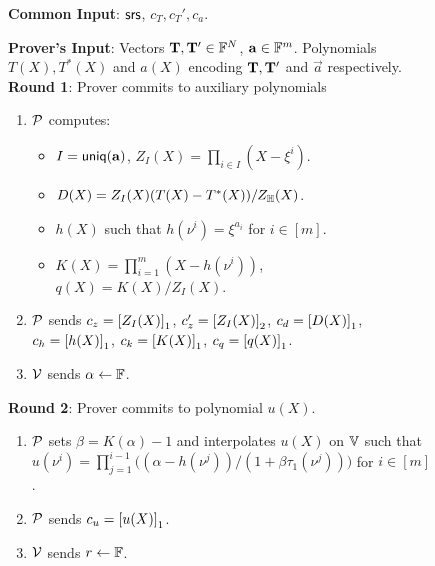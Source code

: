 \begin{figure}[htbp]
    \begin{mdframed}

        {\bf Common Input}: $\mathsf{srs}$, $c_T, c_T', c_a$.

        {\bf Prover's Input}: Vectors $\mathbf{T},\mathbf{T}'\in \mathbb{F}^N$, $\mathbf{a}\in \mathbb{F}^m$. Polynomials $T(X),T^*(X)$ and
        $a(X)$ encoding $\mathbf{T},\mathbf{T}'$ and $\vec{a}$ respectively.\\

        {\bf Round 1}: Prover commits to auxiliary polynomials
        \begin{enumerate}[leftmargin=1em, label=\arabic*.]
            \item $\mathcal{P}$ computes:
                \begin{itemize}[leftmargin=1em, label=-]
                \item $I=\mathsf{uniq}(\mathbf{{a}})$, $Z_I(X)=\prod_{i\in I}(X-\xi^i)$.
                \item $D(X)=Z_I(X)(T(X) - T^*(X))/Z_\mathbb{H}(X)$.
                \item $h(X)$ such that $h(\nu^i)=\xi^{a_i}$ for $i\in [m]$.
                \item $K(X)=\prod_{i=1}^m (X - h(\nu^i))$, $q(X)=K(X)/Z_I(X)$.
                \end{itemize}
            \item $\mathcal{P}$ sends $c_z = \left[{Z_I(X)}\right]_1$, $c_z'=\left[{Z_I(X)}\right]_2$, $c_d=\left[{D(X)}\right]_1$, $c_h=\left[{h(X)}\right]_1$, $c_k=\left[{K(X)}\right]_1$,
            $c_q=\left[{q(X)}\right]_1$.
            \item $\mathcal{V}$ sends $\alpha\gets \mathbb{F}$.
        \end{enumerate}

        {\bf Round 2}: Prover commits to polynomial $u(X)$.
        \begin{enumerate}[leftmargin=1em, label=\arabic*.]
            \item $\mathcal{P}$ sets $\beta=K(\alpha)-1$ and interpolates $u(X)$ on $\mathbb{V}$ such that
                $u(\nu^i)=\prod_{j=1}^{i-1}\big((\alpha - h(\nu^j))/(1 + \beta\tau_1(\nu^j))\big)$ for $i\in [m]$.
            \item $\mathcal{P}$ sends $c_u=\left[{u(X)}\right]_1$.
            \item $\mathcal{V}$ sends $r\gets \mathbb{F}$.
        \end{enumerate}



\end{mdframed}
\end{figure}

